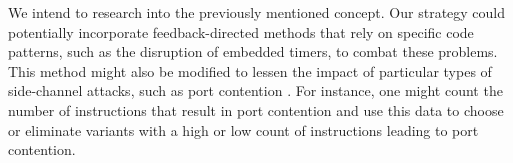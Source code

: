 We intend to research into the previously mentioned concept. 
Our strategy could potentially incorporate feedback-directed methods that rely on specific code patterns, such as the disruption of embedded timers, to combat these problems. 
This method might also be modified to lessen the impact of particular types of side-channel attacks, such as port contention \cite{10.1145/3488932.3517411}. 
For instance, one might count the number of instructions that result in port contention and use this data to choose or eliminate variants with a high or low count of instructions leading to port contention.


